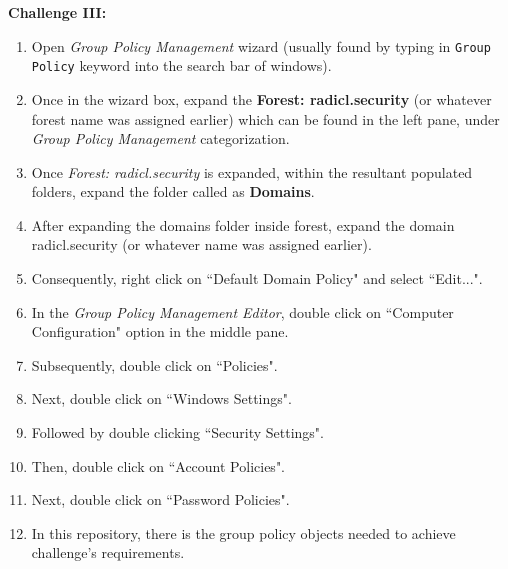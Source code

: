 \documentclass[12pt]{extarticle}
\newcommand{\ben}{\begin{enumerate}}
\newcommand{\een}{\end{enumerate}}
\begin{document}
		\vspace{4mm}
		\item \textbf{Challenge III:}
		\ben
			\item Open \textit{Group Policy Management} wizard (usually found by typing in \texttt{Group Policy} keyword into the search bar of windows).
			\item Once in the wizard box, expand the \textbf{Forest: radicl.security} (or whatever forest name was assigned earlier) which can be found in the left pane, under \textit{Group Policy Management} categorization.
			\item Once \textit{Forest: radicl.security} is expanded, within the resultant populated folders, expand the folder called as \textbf{Domains}.
			\item After expanding the domains folder inside forest, expand the domain radicl.security (or whatever name was assigned earlier).
			\item Consequently, right click on ``Default Domain Policy" and select ``Edit...".
			\item In the \textit{Group Policy Management Editor}, double click on ``Computer Configuration" option in the middle pane.
			\item Subsequently, double click on ``Policies".
			\item Next, double click on ``Windows Settings".
			\item Followed by double clicking ``Security Settings".
			\item Then, double click on ``Account Policies".
			\item Next, double click on ``Password Policies".
			\item In this repository, there is the group policy objects needed to achieve challenge's requirements. 
		\een

 
	
\end{document}
